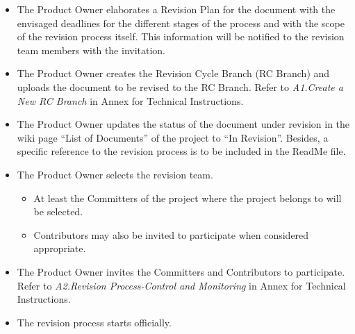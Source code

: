 \documentclass{template/openetcs_article}
\begin{document}
\begin{itemize}
\item The Product Owner elaborates a Revision Plan for the document with the envisaged deadlines for the different stages of the process and with the scope of the revision process itself. This information will be notified to the revision team members with the invitation.
\item The Product Owner creates the Revision Cycle Branch (RC Branch) and uploads the document to be revised to the RC Branch. Refer to {\it A1.Create a New RC Branch} in Annex for Technical Instructions.
\item The Product Owner updates the status of the document under revision in the wiki page “List of Documents” of the project to “In Revision”. Besides, a specific reference to the revision process is to be included in the ReadMe file.  
\item The Product Owner selects the revision team. 
\begin{itemize}
\item At least the Committers of the project where the project belongs to will be selected.
\item Contributors may also be invited to participate when considered appropriate.
\end{itemize}
\item The Product Owner invites the Committers and Contributors to participate. Refer to {\it A2.Revision Process-Control and Monitoring} in Annex for Technical Instructions.
\item The revision process starts officially.
\end{itemize}
\end{document}
